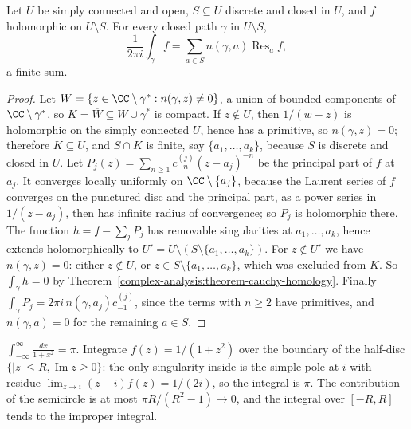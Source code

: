 \begin{theorem}\label{complex-analysis:theorem-residues}
Let $U$ be simply connected and open, $S \subseteq U$ discrete and closed in $U$, and $f$ holomorphic on $U \setminus S$. For every closed path $\gamma$ in $U \setminus S$,
\[
\frac{1}{2\pi i}\int_\gamma f = \sum_{a \in S}n(\gamma, a)\operatorname{Res}_af,
\]
a finite sum.
\end{theorem}

\begin{proof}
Let $W = \{z \in \CC \setminus \gamma^* : n(\gamma, z) \neq 0\}$, a union of bounded components of $\CC \setminus \gamma^*$, so $K = \overline{W} \subseteq W \cup \gamma^*$ is compact. If $z \notin U$, then $1/(w - z)$ is
holomorphic on the simply connected $U$, hence has a primitive, so $n(\gamma, z) = 0$; therefore $K \subseteq U$, and $S \cap K$ is finite, say $\{a_1, \ldots, a_k\}$, because $S$ is discrete and closed in $U$.
Let $P_j(z) = \sum_{n \geq 1}c^{(j)}_{-n}(z - a_j)^{-n}$ be the principal part of $f$ at $a_j$. It converges locally uniformly on $\CC \setminus \{a_j\}$, because the Laurent series of $f$ converges on the
punctured disc and the principal part, as a power series in $1/(z - a_j)$, then has infinite radius of convergence; so $P_j$ is holomorphic there. The function $h = f - \sum_jP_j$ has removable
singularities at $a_1, \ldots, a_k$, hence extends holomorphically to $U' = U \setminus (S \setminus \{a_1, \ldots, a_k\})$. For $z \notin U'$ we have $n(\gamma, z) = 0$: either $z \notin U$, or
$z \in S \setminus \{a_1, \ldots, a_k\}$, which was excluded from $K$. So $\int_\gamma h = 0$ by Theorem~\ref{complex-analysis:theorem-cauchy-homology}. Finally
$\int_\gamma P_j = 2\pi i\,n(\gamma, a_j)c^{(j)}_{-1}$, since the terms with $n \geq 2$ have primitives, and $n(\gamma, a) = 0$ for the remaining $a \in S$.
\end{proof}

\begin{example}\label{complex-analysis:example-residue-computation}
$\int_{-\infty}^{\infty}\frac{dx}{1 + x^2} = \pi$. Integrate $f(z) = 1/(1 + z^2)$ over the boundary of the half-disc $\{|z| \leq R, \operatorname{Im}z \geq 0\}$: the only singularity inside is the simple pole
at $i$ with residue $\lim_{z \to i}(z - i)f(z) = 1/(2i)$, so the integral is $\pi$. The contribution of the semicircle is at most $\pi R/(R^2 - 1) \to 0$, and the integral over $[-R, R]$ tends to the
improper integral.
\end{example}

